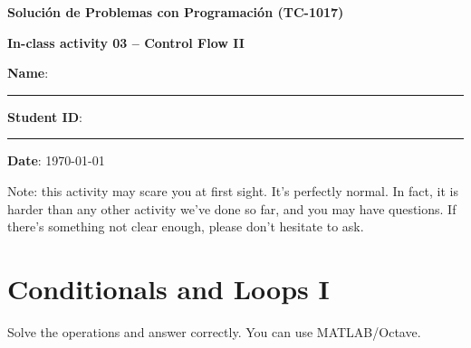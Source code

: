 \documentclass[spanish, 10pt]{article}
\begin{document}
\begin{center}
	{\Large \textbf{Solución de Problemas con Programación (TC-1017)}}
	
	\bigskip
	{\large \textbf{In-class activity 03 -- Control Flow II}}
\end{center}

\bigskip
{\large \textbf{Name}: \rule{13.7 cm}{0.4mm}}



\bigskip
{\large \textbf{Student ID}: \rule{5 cm}{0.4mm}} \hfill {\large \textbf{Date}: \today}

\bigskip

{\footnotesize Note: this activity may scare you at first sight. It's perfectly normal.
In fact, it is harder than any other activity we've done so far, and you may have questions.
If there's something not clear enough, please don't hesitate to ask.}

\section{Conditionals and Loops I}

Solve the operations and answer correctly. You can use MATLAB/Octave.
\end{document}
